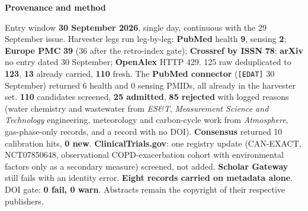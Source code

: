 \documentclass[10pt]{article}
\begin{document}
\begin{keybox}
{\sffamily\bfseries\footnotesize\color{Deep}Provenance and method}\\[1.2mm]
{\fontsize{7.2}{8.8}\selectfont
Entry window \textbf{30 September 2026}, single day, continuous with the 29 September issue.
Harvester legs run leg-by-leg: \textbf{PubMed} health \textbf{9}, sensing \textbf{2}; \textbf{Europe PMC}
\textbf{39} (36 after the retro-index gate); \textbf{Crossref by ISSN} \textbf{78}; \textbf{arXiv} no entry
dated 30 September; \textbf{OpenAlex} HTTP 429. 125 raw deduplicated to \textbf{123}, \textbf{13} already
carried, \textbf{110} fresh. The \textbf{PubMed connector} (\texttt{[EDAT]} 30 September) returned 6 health
and 0 sensing PMIDs, all already in the harvester set. \textbf{110} candidates screened, \textbf{25 admitted},
\textbf{85 rejected} with logged reasons (water chemistry and wastewater from \textit{ES\&T},
\textit{Measurement Science and Technology} engineering, meteorology and carbon-cycle work from
\textit{Atmosphere}, gas-phase-only records, and a record with no DOI). \textbf{Consensus} returned 10
calibration hits, \textbf{0 new}. \textbf{ClinicalTrials.gov}: one registry update (CAN-EXACT,
NCT07850648, observational COPD-exacerbation cohort with environmental factors only as a secondary
measure) screened, not added. \textbf{Scholar Gateway} still fails with an identity error.
\textbf{Eight records carried on metadata alone}. DOI gate: \textbf{0 fail, 0 warn}. Abstracts remain
the copyright of their respective publishers.\par}
\end{keybox}
\end{document}
